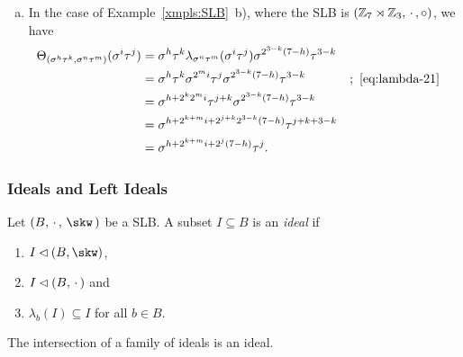 \begin{xmpls}
\begin{enumerate}[a),font=\upshape]
        \item In the case of Example~\ref{xmpls:SLB}~b), where the SLB is $(\mathbb{Z}_7\rtimes\mathbb{Z}_3,\,\cdot\,,\circ)$, we have
        \begin{align*}
            \Theta_{(\sigma^h\tau^k,\sigma^n\tau^m)}(\sigma^i\tau^j)
                &= \sigma^h\tau^k\lambda_{\sigma^n\tau^m}(\sigma^i\tau^j)
                    \sigma^{2^{3-k}(7-h)}\tau^{3-k}\\
                &= \sigma^h\tau^k
                    \sigma^{2^mi}\tau^j
                    \sigma^{2^{3-k}(7-h)}\tau^{3-k}
                    &&;\ \eqref{eq:lambda-21}\\
                &= \sigma^{h+2^k2^mi}\tau^{j+k}\sigma^{2^{3-k}(7-h)}
                    \tau^{3-k}\\
                &= \sigma^{h+2^{k+m}i+2^{j+k}2^{3-k}(7-h)}\tau^{j+k+3-k}\\
                &= \sigma^{h+2^{k+m}i+2^j(7-h)}\tau^j.
        \end{align*}
    \end{enumerate}
\end{xmpls}

\subsubsection*{Ideals and Left Ideals}

\begin{defn}
    Let $(B,\,\cdot\,,\,\skw\,)$ be a SLB. A subset $I\subseteq B$ is an \textsl{ideal\/} if
    \begin{enumerate}[-]
        \item $I\normal(B,\skw)$,
        \item $I\lhd(B,\,\cdot\,)$ and
        \item $\lambda_b(I)\subseteq I$ for all $b\in B$.
    \end{enumerate}
\end{defn}

\begin{rem}
    The intersection of a family of ideals is an ideal.
\end{rem}

